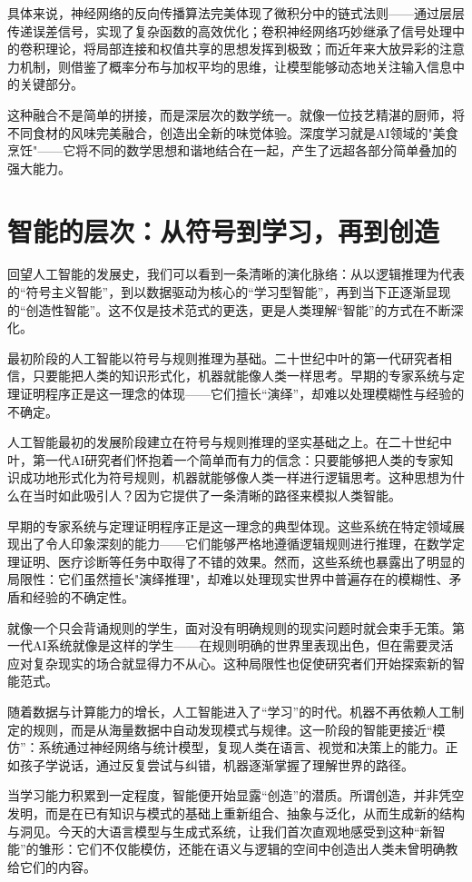 具体来说，神经网络的反向传播算法完美体现了微积分中的链式法则——通过层层传递误差信号，实现了复杂函数的高效优化；卷积神经网络巧妙继承了信号处理中的卷积理论，将局部连接和权值共享的思想发挥到极致；而近年来大放异彩的注意力机制，则借鉴了概率分布与加权平均的思维，让模型能够动态地关注输入信息中的关键部分。

这种融合不是简单的拼接，而是深层次的数学统一。就像一位技艺精湛的厨师，将不同食材的风味完美融合，创造出全新的味觉体验。深度学习就是AI领域的"美食烹饪"——它将不同的数学思想和谐地结合在一起，产生了远超各部分简单叠加的强大能力。

\section{智能的层次：从符号到学习，再到创造}
回望人工智能的发展史，我们可以看到一条清晰的演化脉络：从以逻辑推理为代表的“符号主义智能”，到以数据驱动为核心的“学习型智能”，再到当下正逐渐显现的“创造性智能”。这不仅是技术范式的更迭，更是人类理解“智能”的方式在不断深化。

最初阶段的人工智能以符号与规则推理为基础。二十世纪中叶的第一代研究者相信，只要能把人类的知识形式化，机器就能像人类一样思考。早期的专家系统与定理证明程序正是这一理念的体现——它们擅长“演绎”，却难以处理模糊性与经验的不确定。

人工智能最初的发展阶段建立在符号与规则推理的坚实基础之上。在二十世纪中叶，第一代AI研究者们怀抱着一个简单而有力的信念：只要能够把人类的专家知识成功地形式化为符号规则，机器就能够像人类一样进行逻辑思考。这种思想为什么在当时如此吸引人？因为它提供了一条清晰的路径来模拟人类智能。

早期的专家系统与定理证明程序正是这一理念的典型体现。这些系统在特定领域展现出了令人印象深刻的能力——它们能够严格地遵循逻辑规则进行推理，在数学定理证明、医疗诊断等任务中取得了不错的效果。然而，这些系统也暴露出了明显的局限性：它们虽然擅长"演绎推理"，却难以处理现实世界中普遍存在的模糊性、矛盾和经验的不确定性。

就像一个只会背诵规则的学生，面对没有明确规则的现实问题时就会束手无策。第一代AI系统就像是这样的学生——在规则明确的世界里表现出色，但在需要灵活应对复杂现实的场合就显得力不从心。这种局限性也促使研究者们开始探索新的智能范式。

随着数据与计算能力的增长，人工智能进入了“学习”的时代。机器不再依赖人工制定的规则，而是从海量数据中自动发现模式与规律。这一阶段的智能更接近“模仿”：系统通过神经网络与统计模型，复现人类在语言、视觉和决策上的能力。正如孩子学说话，通过反复尝试与纠错，机器逐渐掌握了理解世界的路径。

当学习能力积累到一定程度，智能便开始显露“创造”的潜质。所谓创造，并非凭空发明，而是在已有知识与模式的基础上重新组合、抽象与泛化，从而生成新的结构与洞见。今天的大语言模型与生成式系统，让我们首次直观地感受到这种“新智能”的雏形：它们不仅能模仿，还能在语义与逻辑的空间中创造出人类未曾明确教给它们的内容。

